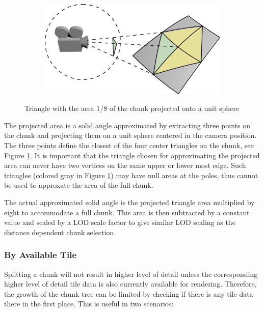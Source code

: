 \begin{figure}[htbp]
    \centering
    \begin{subfigure}[bt]{0.5\textwidth}
        \includegraphics[width=\textwidth]{figures/implementation/chunklod/projectedarea.png}
    \end{subfigure}
    \caption{Triangle with the area 1/8 of the chunk projected onto a unit sphere}
    \label{fig:chunkprojarea}
\end{figure}

The projected area is a solid angle approximated by extracting three points on the chunk and projecting them on a unit sphere centered in the camera position. The three points define the closest of the four center triangles on the chunk, see Figure \ref{fig:chunkprojarea}. It is important that the triangle chosen for approximating the projected area can never have two vertices on the same upper or lower most edge. Such triangles (colored gray in Figure \ref{fig:chunkprojarea}) may have null areas at the poles, thus cannot be used to approxate the area of the full chunk.

The actual approximated solid angle is the projected triangle area multiplied by eight to accommodate a full chunk. This area is then subtracted by a constant value and scaled by a LOD scale factor to give similar LOD scaling as the distance dependent chunk selection.

\subsubsection{By Available Tile}
Splitting a chunk will not result in higher level of detail unless the corresponding higher level of detail tile data is also currently available for rendering. Therefore, the growth of the chunk tree can be limited by checking if there is any tile data there in the first place. This is useful in two scenarios:

